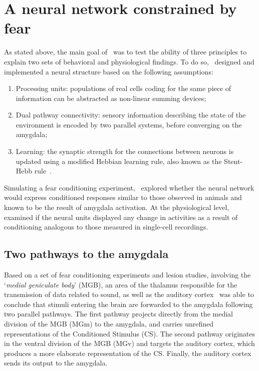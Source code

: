 \section{A neural network constrained by fear}\label{sec:armonyModel}
As stated above, the main goal of~\citet{Armony1995} was to test the ability of three principles to explain two sets of behavioral and physiological findings. To do so,~\citet{Armony1995} designed and implemented a neural structure based on the following assumptions:
\begin{enumerate}
   \item Processing units: populations of real cells coding for the same piece of information can be abstracted as non-linear summing devices;
   \item Dual pathway connectivity: sensory information describing the state of the environment is encoded by two parallel systems, before converging on the amygdala;
   \item Learning: the synaptic strength for the connections between neurons is updated using a modified Hebbian learning rule, also known as the Stent-Hebb rule~\supercite{stent_physiological_1973}.
\end{enumerate}
Simulating a fear conditioning experiment,~\citet{Armony1995} explored whether the neural network would express conditioned responses similar to those observed in animals and known to be the result of amygdala activation. At the physiological level,~\citet{Armony1995} examined if the neural units displayed any change in activities as a result of conditioning analogous to those measured in single-cell recordings.

\subsection{Two pathways to the amygdala}
Based on a set of fear conditioning experiments and lesion studies, involving the `\emph{medial geniculate body}' (MGB), an area of the thalamus responsible for the transmission of data related to sound, as well as the auditory cortex~\citet{Ledoux1992} was able to conclude that stimuli entering the brain are forwarded to the amygdala following two parallel pathways. The first pathway projects directly from the medial division of the MGB (MGm) to the amygdala, and carries unrefined representations of the Conditioned Stimulus (CS). The second pathway originates in the ventral division of the MGB (MGv) and targets the auditory cortex, which produces a more elaborate representation of the CS\@. Finally, the auditory cortex sends its output to the amygdala.\\

